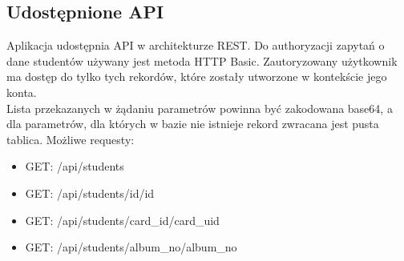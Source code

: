 \documentclass[declaration,shortabstract, mgr]{iithesis}
\begin{document}
\subsection{Udostępnione API}
\indent Aplikacja udostępnia API w architekturze REST\cite{rest}. Do authoryzacji zapytań o dane studentów używany jest metoda HTTP Basic. Zautoryzowany użytkownik ma dostęp do tylko tych rekordów, które zostały utworzone w kontekście jego konta.\\
\indent Lista przekazanych w żądaniu parametrów powinna być zakodowana base64, a dla parametrów, dla których w bazie nie istnieje rekord zwracana jest pusta tablica.
\indent Możliwe requesty:
\begin{itemize}
\item GET: /api/students
\item GET: /api/students/id/{id}
\item GET: /api/students/card\_id/{card\_uid}
\item GET: /api/students/album\_no/{album\_no}
\end{itemize}
\end{document}

